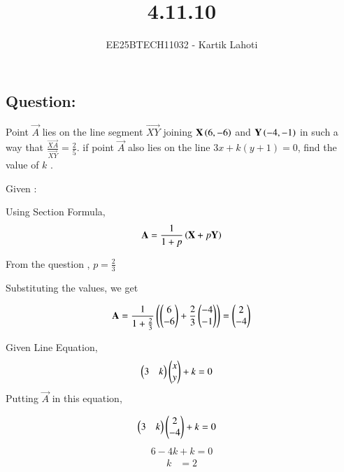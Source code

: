 \documentclass[journal]{IEEEtran}
\numberwithin{equation}{enumi}
\numberwithin{figure}{enumi}
\begin{document}

\vspace{3cm}

\title{4.11.10}
\author{EE25BTECH11032 - Kartik Lahoti}
\maketitle

\subsection*{Question: } 
Point $\vec{A}$ lies on the line segment $\vec{XY}$  joining $\mathbf{X}\left(6,-6\right)$ and $\mathbf{Y}\left(-4,-1\right)$ in such a way that $\frac{\vec{XA}}{\vec{XY}} = \frac{2}{5}$. if point $\vec{A}$ also lies on the line $3x + k(y+1) = 0$, find the value of $k$ .

\solution 

Given : 
\begin{table}[H]
    \centering
    
    \caption*{}
    \label{tab:placeholder_1}
\end{table}


Using Section Formula, 
\begin{align}
    \mathbf{A} = \frac{1}{1+p}\left(\mathbf{X} + p\mathbf{Y}\right)
\end{align}

From the question , $p = \frac{2}{3}$

Substituting the values, we get

\begin{align}
    \mathbf{A} =  \frac{1}{1 + \frac{2}{3}}\left(\begin{pmatrix}6 \\ -6\end{pmatrix} + \frac{2}{3}\begin{pmatrix}-4\\-1\end{pmatrix}\right) = \begin{pmatrix}2 \\ -4\end{pmatrix}
\end{align}

Given Line Equation, 
\begin{align}
        \begin{pmatrix}3 & k\end{pmatrix}\begin{pmatrix}x \\ y\end{pmatrix} + k &= 0  
\end{align}
Putting $\vec{A}$ in this equation,

\begin{align}
    \begin{pmatrix}3 & k\end{pmatrix}\begin{pmatrix}2 \\ -4\end{pmatrix} + k &= 0 
\end{align}
\begin{align}
    6 - 4k + k = 0 
\end{align}
\begin{align}
    k &= 2
\end{align}
\end{document}
